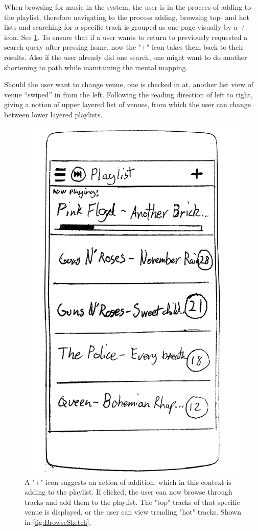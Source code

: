When browsing for music in the system, the user is in the procces of
adding to the playlist, therefore navigating to the process adding,
browsing top- and hot lists and searching for a specific track is
grouped as one page visually by a \emph{+} icon. See
\cref{fig:PlaylistSketch}. To ensure that if a user wants to return to
previously requested a search query after pressing home, now the "+"
icon takes them back to their results. Also if the user already did
one search, one might want to do another shortening to path while
maintaining the mental mapping. 

Should the user want to change venue, one is checked in at, another list view of venue \enquote{swiped} in from the left. Following the reading direction of left to right, giving a notion of upper layered list of venues, from which the user can change between lower layered playlists.


\begin{figure}[hbtp]
  \centering
  \includegraphics[width=0.3\linewidth]{Images/sketch3.png}
  \caption{A "+" icon suggests an action of addition, which in this context is adding to the playlist. If clicked, the user can now browse through tracks and add them to the playlist. The "top" tracks of that specific venue is displayed, or the user can view trending "hot" tracks. Shown in \cref{fig:BrowseSketch}.}
  \label{fig:PlaylistSketch}
\end{figure}


